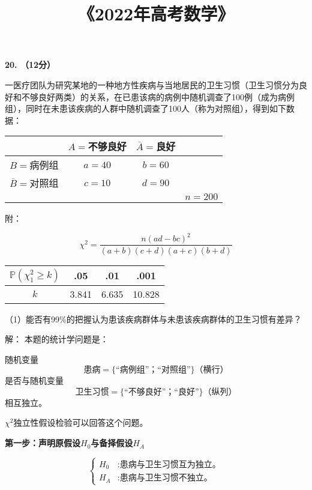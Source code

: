 \documentclass[a4paper,12pt]{article}
\title{《2022年高考数学》}
\author{}
\date{}
\newcommand{\p}[1]{\mathbb{P}\left(#1\right)}
\renewcommand{\bar}[1]{\overline{#1}}
\begin{document}
\maketitle

\setcounter{section}{19}

\textbf{20. （12分）}

一医疗团队为研究某地的一种地方性疾病与当地居民的卫生习惯（卫生习惯分为良好和不够良好两类）的关系，在已患该病的病例中随机调查了100例（成为病例组），同时在未患该疾病的人群中随机调查了100人（称为对照组），得到如下数据：
\begin{center}
    \begin{tabular}{c c c c}
    \hline
                & $A=$不够良好 & $\bar{A}=$良好 & \\
    \hline
        $B=$病例组  & $a = 40$    & $b = 60$ & \\
        $\bar{B}=$对照组  & $c = 10$    & $d = 90$ & \\
    \hline
        & & & $n = 200$
    \end{tabular}
\end{center}

附：

\[ \chi^2 = \frac{n(ad - bc)^2}{(a+b)(c+d)(a+c)(b+d)} \]

\begin{center}
    \begin{tabular}{c | c c c}
        $\p{\chi^2_1 \geq k}$ & .05 & .01 & .001\\
    \hline
        $k$  & 3.841 & 6.635 & 10.828\\
    \end{tabular}
\end{center}

\newpage

（1）能否有99\%的把握认为患该疾病群体与未患该疾病群体的卫生习惯有差异？

\color{blue}
解：
本题的统计学问题是：

随机变量
$$\text{患病}=\{\text{“病例组”；}\text{“对照组”}\}（横行）$$
是否与随机变量
$$\text{卫生习惯}=\{\text{“不够良好”；}\text{“良好”}\}（纵列）$$
相互独立。

$\chi^2$独立性假设检验可以回答这个问题。

\textbf{第一步：声明原假设$H_0$与备择假设$H_A$}

\begin{equation*}
    \left\{
        \begin{aligned}
            H_0 &: \text{患病与卫生习惯互为独立。} \\
            H_A &: \text{患病与卫生习惯不独立。}
        \end{aligned}
    \right.
\end{equation*}
\end{document}
